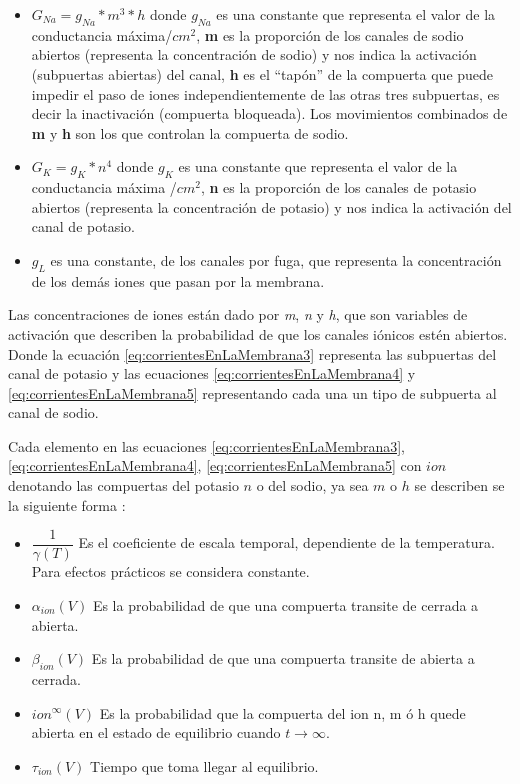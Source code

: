 \begin{itemize}
 \item \({G_{Na}} = g_{Na} * m ^3 * h \) donde \(g_{Na}\) es una constante que representa el valor de la conductancia máxima/\(cm ^2\), \textbf{m} es la proporción de los canales de sodio abiertos (representa la concentración de sodio) y nos indica la activación (subpuertas abiertas) del canal, \textbf{h} es el “tapón” de la compuerta que puede impedir el paso de iones independientemente de las otras tres subpuertas, es decir la inactivación (compuerta bloqueada).
Los movimientos combinados de \textbf{m} y \textbf{h} son los que controlan la compuerta de sodio.
 \item \({G_{K}} = g_{K} * n^4\) donde \(g_{K}\) es una constante que representa el valor de la conductancia máxima /\(cm^2\), \textbf{n} es la proporción de los canales de potasio abiertos (representa la concentración de potasio) y nos indica la activación del canal de potasio.
 \item \(g_{L}\) es una constante, de los canales por fuga, que representa la concentración de los demás iones que pasan por la membrana.
\end{itemize}

Las concentraciones de iones están dado por \emph{m}, \emph{n} y \emph{h}, que son variables de activación que describen la probabilidad de que los canales iónicos estén abiertos. Donde la ecuación \ref{eq:corrientesEnLaMembrana3} representa las subpuertas del canal de potasio y las ecuaciones \ref{eq:corrientesEnLaMembrana4} y \ref{eq:corrientesEnLaMembrana5} representando cada una un tipo de subpuerta al canal de sodio.

Cada elemento en las ecuaciones \ref{eq:corrientesEnLaMembrana3}, \ref{eq:corrientesEnLaMembrana4}, \ref{eq:corrientesEnLaMembrana5} con \(ion\) denotando las compuertas del potasio \(n\) o del sodio, ya sea \(m\) o \(h\) se describen se la siguiente forma \parencite{HH52}:

\begin{itemize}
 \item \(\dfrac{1}{\gamma(T)}\) Es el coeficiente de escala temporal, dependiente de la temperatura. Para efectos prácticos se considera constante.
 \item \(\alpha_{ion}(V)\) Es la probabilidad de que una compuerta transite de cerrada a abierta.
 \item \(\beta_{ion}(V)\) Es la probabilidad de que una compuerta transite de abierta a cerrada.
 \item \(ion^\infty(V)\) Es la probabilidad que la compuerta del ion n, m ó h quede abierta en el estado de equilibrio cuando \(t \rightarrow \infty\).
 
 \item \(\tau_{ion}(V)\) Tiempo que toma llegar al equilibrio.
\end{itemize}

